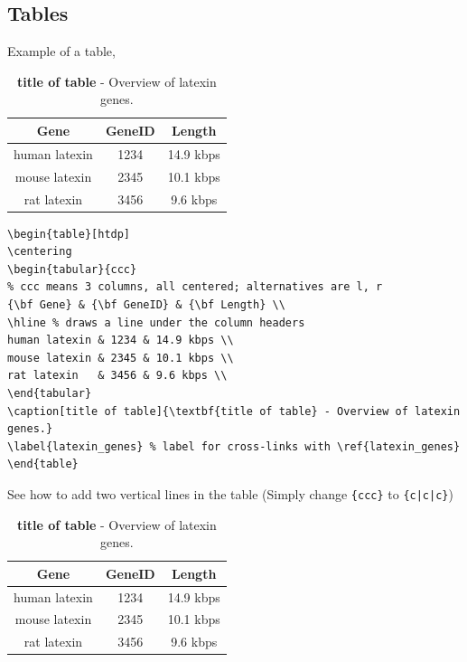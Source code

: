 \documentclass[11pt]{book}
\begin{document}
\subsection{Tables}\label{table}
Example of a table,
\begin{table}[htdp]
\centering
\begin{tabular}{ccc} %
{\bf Gene} & {\bf GeneID} & {\bf Length} \\ 
\hline %
human latexin & 1234 & 14.9 kbps \\
mouse latexin & 2345 & 10.1 kbps \\
rat latexin   & 3456 & 9.6 kbps \\
\end{tabular}
\caption[title of table]{\textbf{title of table} - Overview of latexin genes.}
\label{latexin_genes} %
\end{table}
\begin{verbatim}
\begin{table}[htdp]
\centering
\begin{tabular}{ccc} 
% ccc means 3 columns, all centered; alternatives are l, r
{\bf Gene} & {\bf GeneID} & {\bf Length} \\ 
\hline % draws a line under the column headers
human latexin & 1234 & 14.9 kbps \\
mouse latexin & 2345 & 10.1 kbps \\
rat latexin   & 3456 & 9.6 kbps \\
\end{tabular}
\caption[title of table]{\textbf{title of table} - Overview of latexin genes.}
\label{latexin_genes} % label for cross-links with \ref{latexin_genes}
\end{table}
\end{verbatim}
See how to add two vertical lines in the table (Simply change \verb+{ccc}+ to \verb+{c|c|c}+)
\begin{table}[htdp]
\centering
\begin{tabular}{c|c|c} %
{\bf Gene} & {\bf GeneID} & {\bf Length} \\ 
\hline %
human latexin & 1234 & 14.9 kbps \\
mouse latexin & 2345 & 10.1 kbps \\
rat latexin   & 3456 & 9.6 kbps \\
\end{tabular}
\caption[title of table]{\textbf{title of table} - Overview of latexin genes.}
\label{latexin_genes2} %
\end{table}
\end{document}

